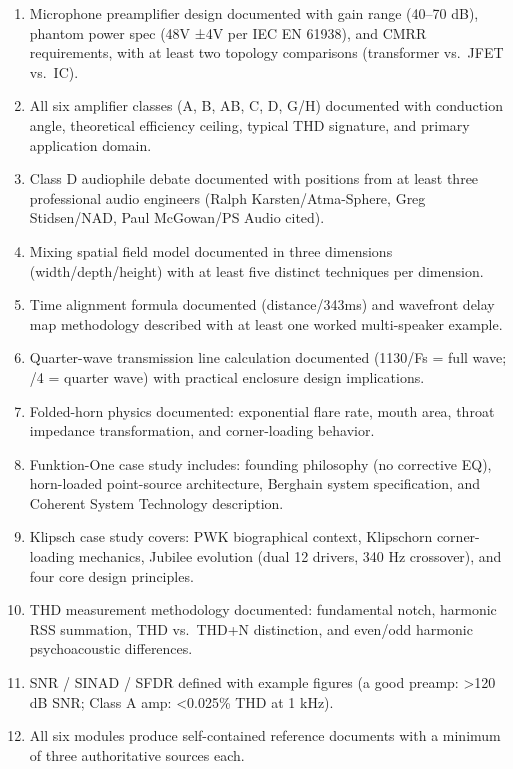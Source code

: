 \documentclass[11pt,letterpaper]{article}
\begin{document}
\begin{enumerate}
  \item Microphone preamplifier design documented with gain range (40--70 dB), phantom power spec (48V ±4V per IEC EN 61938), and CMRR requirements, with at least two topology comparisons (transformer vs.\ JFET vs.\ IC).
  \item All six amplifier classes (A, B, AB, C, D, G/H) documented with conduction angle, theoretical efficiency ceiling, typical THD signature, and primary application domain.
  \item Class D audiophile debate documented with positions from at least three professional audio engineers (Ralph Karsten/Atma-Sphere, Greg Stidsen/NAD, Paul McGowan/PS Audio cited).
  \item Mixing spatial field model documented in three dimensions (width/depth/height) with at least five distinct techniques per dimension.
  \item Time alignment formula documented (distance/343ms) and wavefront delay map methodology described with at least one worked multi-speaker example.
  \item Quarter-wave transmission line calculation documented (1130/Fs = full wave; /4 = quarter wave) with practical enclosure design implications.
  \item Folded-horn physics documented: exponential flare rate, mouth area, throat impedance transformation, and corner-loading behavior.
  \item Funktion-One case study includes: founding philosophy (no corrective EQ), horn-loaded point-source architecture, Berghain system specification, and Coherent System Technology description.
  \item Klipsch case study covers: PWK biographical context, Klipschorn corner-loading mechanics, Jubilee evolution (dual 12\textquotedbl{} drivers, 340 Hz crossover), and four core design principles.
  \item THD measurement methodology documented: fundamental notch, harmonic RSS summation, THD vs.\ THD+N distinction, and even/odd harmonic psychoacoustic differences.
  \item SNR / SINAD / SFDR defined with example figures (a good preamp: >120 dB SNR; Class A amp: <0.025\% THD at 1 kHz).
  \item All six modules produce self-contained reference documents with a minimum of three authoritative sources each.
\end{enumerate}
\end{document}
